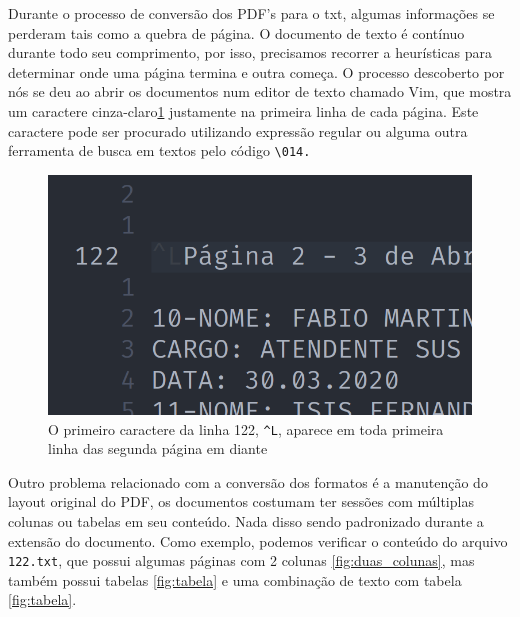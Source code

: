 \documentclass[10pt, a4paper]{article}
\begin{document}
Durante o processo de conversão dos PDF's para o txt, algumas informações se perderam tais como a quebra de página. O documento de texto é contínuo durante todo seu comprimento, por isso, precisamos recorrer a heurísticas para determinar onde uma página termina e outra começa. O processo descoberto por nós se deu ao abrir os documentos num editor de texto chamado Vim, que mostra um caractere cinza-claro\ref{fig:quebra_de_pagina} justamente na primeira linha de cada página. Este caractere pode ser procurado utilizando expressão regular ou alguma outra ferramenta de busca em textos pelo código  \texttt{\textbackslash 014.}

\begin{figure}[H]
    \centering
    \includegraphics[scale=0.4]{images/prints/quebra_pagina.png}
    \caption{O primeiro caractere da linha 122,  \texttt{\textasciicircum L}, aparece em toda primeira linha das segunda página em diante}
    \label{fig:quebra_de_pagina}
\end{figure}

Outro problema relacionado com a conversão dos formatos é a manutenção do layout original do PDF, os documentos costumam ter sessões com múltiplas colunas ou tabelas em seu conteúdo. Nada disso sendo padronizado durante a extensão do documento. Como exemplo, podemos verificar o conteúdo do arquivo \texttt{122.txt}, que possui algumas páginas com 2 colunas \ref{fig:duas_colunas}, mas também possui tabelas \ref{fig:tabela} e uma combinação de texto com tabela \ref{fig:tabela}.
\end{document}
